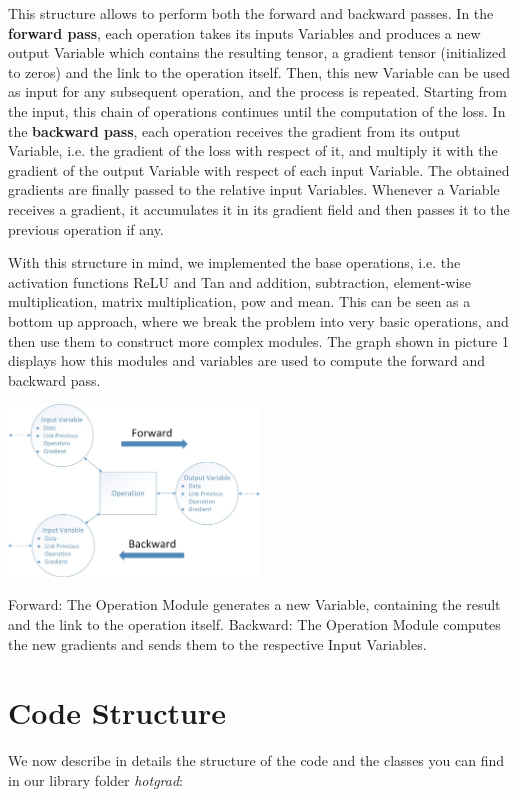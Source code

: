 \documentclass[10pt,conference,compsocconf]{IEEEtran}
\begin{document}
This structure allows to perform both the forward and backward passes. In the \textbf{forward pass}, each operation takes its inputs Variables and produces a new output Variable which contains the resulting tensor, a gradient tensor (initialized to zeros) and the link to the operation itself. Then, this new Variable can be used as input for any subsequent operation, and the process is repeated. Starting from the input, this chain of operations continues until the computation of the loss. In the \textbf{backward pass}, each operation receives the gradient from its output Variable, i.e. the gradient of the loss with respect of it, and multiply it with the gradient of the output Variable with respect of each input Variable. The obtained gradients are finally passed to the relative input Variables. Whenever a Variable receives a gradient, it accumulates it in its gradient field and then passes it to the previous operation if any.

With this structure in mind, we implemented the base operations, i.e. the activation functions ReLU and Tan and addition, subtraction, element-wise multiplication, matrix multiplication, pow and mean. This can be seen as a bottom up approach, where we break the problem into very basic operations, and then use them to construct more complex modules. The graph shown in picture 1  displays how this modules and variables are used to compute the forward and backward pass.

\begin{center}
	\captionsetup{type=figure}
	\includegraphics[width=0.5\textwidth]{img/ForwardBackward.jpg}
	\label{fig:ForwardBackward}
	\caption {Forward: The Operation Module generates a new Variable, containing the result and the link to the operation itself. Backward: The Operation Module computes the new gradients and sends them to the respective Input Variables.}
\end{center}        
        
\section{Code Structure}
We now describe in details the structure of the code and the classes you can find in our library folder \textit{hotgrad}:
\end{document}

